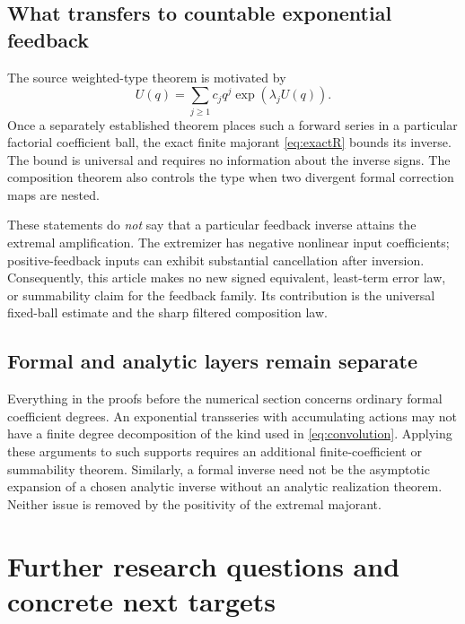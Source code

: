 \documentclass[11pt,a4paper]{article}
\theoremstyle{definition}
\theoremstyle{remark}
\numberwithin{equation}{section}
\begin{document}
\subsection{What transfers to countable exponential feedback}
The source weighted-type theorem is motivated by
\[
 U(q)=\sum_{j\ge1}c_jq^j\exp(\lambda_jU(q)).
\]
Once a separately established theorem places such a forward series in
a particular factorial coefficient ball, the exact finite majorant
\eqref{eq:exactR} bounds its inverse. The bound is universal and requires
no information about the inverse signs. The composition theorem also
controls the type when two divergent formal correction maps are nested.

These statements do \emph{not} say that a particular feedback inverse
attains the extremal amplification. The extremizer has negative
nonlinear input coefficients; positive-feedback inputs can exhibit
substantial cancellation after inversion. Consequently, this article
makes no new signed equivalent, least-term error law, or summability
claim for the feedback family. Its contribution is the universal
fixed-ball estimate and the sharp filtered composition law.

\subsection{Formal and analytic layers remain separate}
Everything in the proofs before the numerical section concerns ordinary
formal coefficient degrees. An exponential transseries with accumulating
actions may not have a finite degree decomposition of the kind used in
\eqref{eq:convolution}. Applying these arguments to such supports requires
an additional finite-coefficient or summability theorem. Similarly,
a formal inverse need not be the asymptotic expansion of a chosen
analytic inverse without an analytic realization theorem. Neither issue
is removed by the positivity of the extremal majorant.

\section{Further research questions and concrete next targets}
\label{sec:questions}
\end{document}
